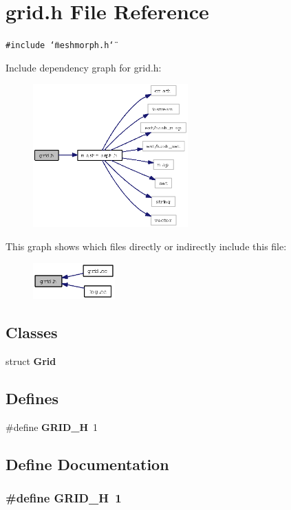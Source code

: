 \section{grid.h File Reference}
\label{grid_8h}
{\tt \#include \char`\"{}meshmorph.h\char`\"{}}\par


Include dependency graph for grid.h:\begin{figure}[H]
\begin{center}
\leavevmode
\includegraphics[width=169pt]{grid_8h__incl}
\end{center}
\end{figure}


This graph shows which files directly or indirectly include this file:\begin{figure}[H]
\begin{center}
\leavevmode
\includegraphics[width=89pt]{grid_8h__dep__incl}
\end{center}
\end{figure}
\subsection*{Classes}
\begin{CompactItemize}
\item 
struct {\bf Grid}
\end{CompactItemize}
\subsection*{Defines}
\begin{CompactItemize}
\item 
\#define {\bf GRID\_\-H}~1
\end{CompactItemize}


\subsection{Define Documentation}
\subsubsection{\setlength{\rightskip}{0pt plus 5cm}\#define GRID\_\-H~1}\label{grid_8h_dcb80e765677817322ab019e3a10f540}



